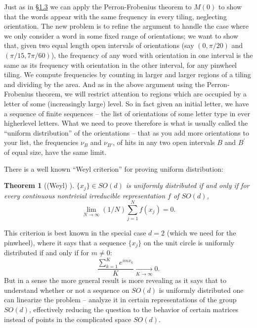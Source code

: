 \documentclass[reqno]{stml-l}
\theoremstyle{plain}
\newtheorem{theorem}{Theorem}[chapter]
\theoremstyle{definition}
\numberwithin{equation}{chapter}
\begin{document}
Just as in \S \hyperref[ch01:sec3]{1.3} we can apply the Perron-Frobenius theorem to $M(0)$ to show that the words appear with the same frequency in every tiling, neglecting orientation. The new problem is to refine the argument to handle the case where we only consider a word in some fixed range of orientations; we want to show that, given two equal length open intervals of orientations (say $(0, \pi/20)$ and $(\pi/15,7\pi/60)$), the frequency of any word with orientation in one interval is the same as its frequency with orientation in the other interval, for any pinwheel tiling. We compute frequencies by counting in larger and larger regions of a tiling and dividing by the area. And as in the above argument using the Perron-Frobenius theorem, we will restrict attention to regions which are occupied by a letter of some (increasingly large) level. So in fact given an initial letter, we have a sequence of finite sequences
-- the list of orientations of some letter type in ever higherlevel letters. What we need to prove therefore is what is usually called the ``uniform distribution'' of the orientations -- that as you add more orientations to your list, the frequencies $\nu_{B}$ and $\nu_{B{\prime}}$, of hits in any two open intervals $B$ and $B^{\prime}$ of equal size, have the same limit.

There is a well known ``Weyl criterion'' for proving uniform distribution:

\begin{theorem}[(Weyl) {\cite[p. 226]{bib:KuN}}]\label{ch04:thm4.5}
$\{x_{j}\}\in SO(d)$ is uniformly distributed if and only if for every continuous nontrivial irreducible representation $f$ of $SO(d)$,
\begin{equation}\label{ch04:eqn4.11}
\lim_{N\rightarrow\infty}(1/N)\sum\limits_{j=1}^{N}f(x_{j})=0.
\end{equation}
\end{theorem}

This criterion is best known in the special case $d=2$ (which we need for the pinwheel), where it says that a sequence $\{x_{j}\}$ on the unit circle is uniformly distributed if and only if for $m\neq 0$:
\begin{equation}\label{ch04:eqn4.12}
\frac{\sum\nolimits_{k=1}^{K}e^{imx_{k}}}{K}\mathop{\longrightarrow}\limits_{K\rightarrow\infty} 0.
\end{equation}
But in a sense the more general result is more revealing as it says that to understand whether or not a sequence on $SO(d)$ is uniformly distributed one can linearize the problem -- analyze it in certain representations of the group $SO(d)$, effectively reducing the question to the behavior of certain matrices instead of points in the complicated space $SO(d)$.
\end{document}
